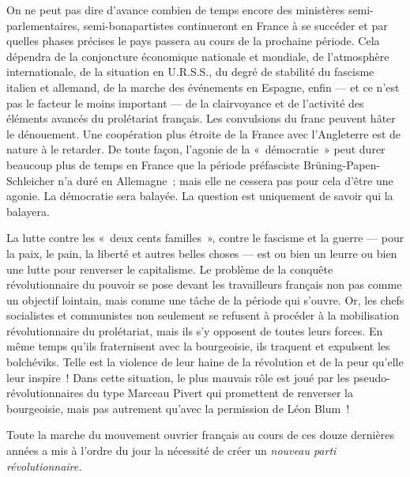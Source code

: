 \documentclass[french,twoside]{book} %
\begin{document}
On ne peut pas dire d’avance combien de temps encore des ministères semi-parlementaires, semi-bonapartistes continueront en France à se succéder et par quelles phases précises le pays passera au cours de la prochaine période. Cela dépendra de la conjoncture économique nationale et mondiale, de l’atmosphère internationale, de la situation en U.R.S.S., du degré de stabilité du fascisme italien et allemand, de la marche des événements en Espagne, enfin — et ce n’est pas le facteur le  moins important — de la clairvoyance et de l’activité des éléments avancés du prolétariat français. Les convulsions du franc peuvent hâter le dénouement. Une coopération plus étroite de la France avec l’Angleterre est de nature à le retarder. De toute façon, l’agonie de la « démocratie » peut durer beaucoup plus de temps en France que la période préfasciste Brüning-Papen-Schleicher n’a duré en Allemagne ; mais elle ne cessera pas pour cela d’être une agonie. La démocratie sera balayée. La question est uniquement de savoir qui la balayera.\par
La lutte contre les « deux cents familles », contre le fascisme et la guerre — pour la paix, le pain, la liberté et autres belles choses — est ou bien un leurre ou bien une lutte pour renverser le capitalisme. Le problème de la conquête révolutionnaire du pouvoir se pose devant les travailleurs français non pas comme un objectif lointain, mais comme une tâche de la période qui s’ouvre. Or, les chefs socialistes et communistes non seulement se refusent à procéder à la mobilisation révolutionnaire du prolétariat, mais ils s’y opposent de toutes leurs forces. En même temps qu’ils fraternisent avec la bourgeoisie, ils traquent et expulsent les bolchéviks. Telle est la violence de leur haine de la révolution et de la peur qu’elle leur inspire ! Dans cette situation, le plus mauvais rôle est joué par les pseudo-révolutionnaires du type Marceau Pivert qui promettent de renverser la bourgeoisie, mais pas autrement qu’avec la permission de Léon Blum !\par
Toute la marche du mouvement ouvrier français au cours de ces douze dernières années a mis à l’ordre du jour la nécessité de créer un \emph{nouveau parti révolutionnaire.}\par
\end{document}
